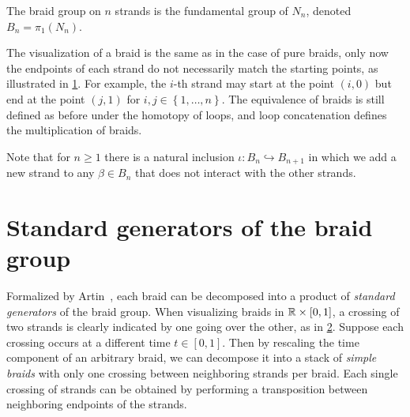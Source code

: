 \begin{definition}
    The braid group on $n$ strands is the fundamental group of $N_n$, denoted $B_n = \pi_1(N_n)$.
\end{definition}

The visualization of a braid is the same as in the case of pure braids, only now the endpoints of each strand do not necessarily match the starting points, as illustrated in \cref{fig:C_general_braid}. For example, the $i$-th strand may start at the point $(i,0)$ but end at the point $(j,1)$ for $i,j\in\left\{ 1,\dots,n \right\}$. The equivalence of braids is still defined as before under the homotopy of loops, and loop concatenation defines the multiplication of braids.

\begin{figure}[htbp]
    \centering
    
    \label{fig:C_general_braid}
\end{figure}

Note that for $n\geq 1$ there is a natural inclusion $\iota:B_n\hookrightarrow B_{n+1}$ in which we add a new strand to any $\beta\in B_n$ that does not interact with the other strands.

\section{Standard generators of the braid group}\label{sec:std_gens}
Formalized by Artin~\cite{Artin1947}, each braid can be decomposed into a product of \textit{standard generators} of the braid group. When visualizing braids in $\mathbb{R}\times[0,1]$, a crossing of two strands is clearly indicated by one going over the other, as in \cref{fig:Gen_on_Strands}. Suppose each crossing occurs at a different time $t\in[0,1]$. Then by rescaling the time component of an arbitrary braid, we can decompose it into a stack of \textit{simple braids} with only one crossing between neighboring strands per braid. Each single crossing of strands can be obtained by performing a transposition between neighboring endpoints of the strands.

\begin{figure}[htbp]
    \centering
    
    \label{fig:Gen_on_Strands}
\end{figure}


